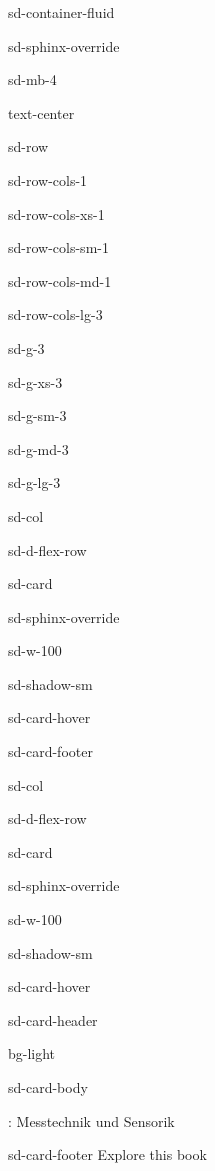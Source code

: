 \documentclass[letterpaper,10pt,english]{jupyterBook}
\let\sphinxpxdimen\pdfpxdimen\else\newdimen\sphinxpxdimen
\begin{document}
\begin{sphinxuseclass}{sd-container-fluid}
\begin{sphinxuseclass}{sd-sphinx-override}
\begin{sphinxuseclass}{sd-mb-4}
\begin{sphinxuseclass}{text-center}
\begin{sphinxuseclass}{sd-row}
\begin{sphinxuseclass}{sd-row-cols-1}
\begin{sphinxuseclass}{sd-row-cols-xs-1}
\begin{sphinxuseclass}{sd-row-cols-sm-1}
\begin{sphinxuseclass}{sd-row-cols-md-1}
\begin{sphinxuseclass}{sd-row-cols-lg-3}
\begin{sphinxuseclass}{sd-g-3}
\begin{sphinxuseclass}{sd-g-xs-3}
\begin{sphinxuseclass}{sd-g-sm-3}
\begin{sphinxuseclass}{sd-g-md-3}
\begin{sphinxuseclass}{sd-g-lg-3}
\begin{sphinxuseclass}{sd-col}
\begin{sphinxuseclass}{sd-d-flex-row}
\begin{sphinxuseclass}{sd-card}
\begin{sphinxuseclass}{sd-sphinx-override}
\begin{sphinxuseclass}{sd-w-100}
\begin{sphinxuseclass}{sd-shadow-sm}
\begin{sphinxuseclass}{sd-card-hover}
\begin{sphinxuseclass}{sd-card-footer}
\end{sphinxuseclass}
\end{sphinxuseclass}
\end{sphinxuseclass}
\end{sphinxuseclass}
\end{sphinxuseclass}
\end{sphinxuseclass}
\end{sphinxuseclass}
\end{sphinxuseclass}
\begin{sphinxuseclass}{sd-col}
\begin{sphinxuseclass}{sd-d-flex-row}
\begin{sphinxuseclass}{sd-card}
\begin{sphinxuseclass}{sd-sphinx-override}
\begin{sphinxuseclass}{sd-w-100}
\begin{sphinxuseclass}{sd-shadow-sm}
\begin{sphinxuseclass}{sd-card-hover}
\begin{sphinxuseclass}{sd-card-header}
\begin{sphinxuseclass}{bg-light}
\sphinxAtStartPar
{}

\end{sphinxuseclass}
\end{sphinxuseclass}
\begin{sphinxuseclass}{sd-card-body}
\noindent\sphinxincludegraphics[height=150\sphinxpxdimen]{{2020_Book_Boettcher}.png}

\sphinxAtStartPar
{}: Messtechnik und Sensorik

\end{sphinxuseclass}
\begin{sphinxuseclass}{sd-card-footer}
\sphinxAtStartPar
Explore this book 


\end{sphinxuseclass}
\end{sphinxuseclass}
\end{sphinxuseclass}
\end{sphinxuseclass}
\end{sphinxuseclass}
\end{sphinxuseclass}
\end{sphinxuseclass}
\end{sphinxuseclass}
\end{sphinxuseclass}
\end{sphinxuseclass}
\end{sphinxuseclass}
\end{sphinxuseclass}
\end{sphinxuseclass}
\end{sphinxuseclass}
\end{sphinxuseclass}
\end{sphinxuseclass}
\end{sphinxuseclass}
\end{sphinxuseclass}
\end{sphinxuseclass}
\end{sphinxuseclass}
\end{sphinxuseclass}
\end{sphinxuseclass}
\end{sphinxuseclass}
\end{document}
